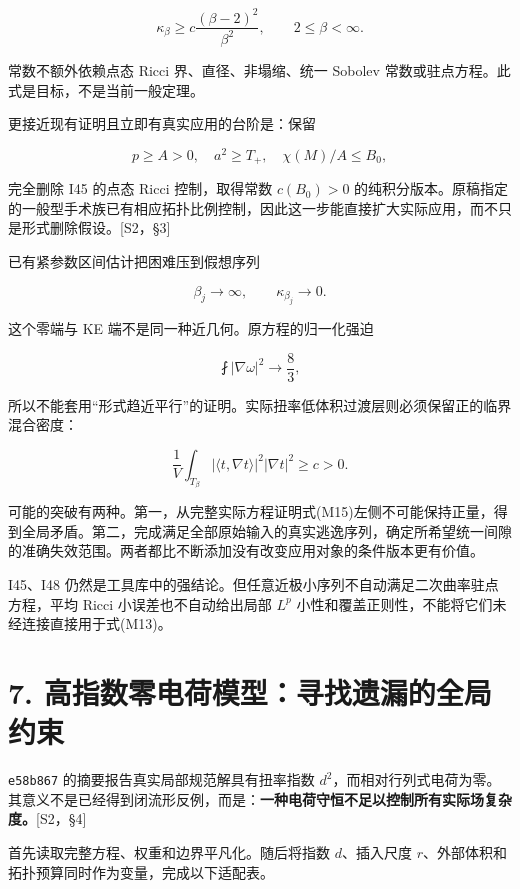 \documentclass[UTF8,a4paper,11pt,fontset=fandol]{ctexart}
\begin{document}
\[
\boxed{\kappa_\beta\ge c\frac{(\beta-2)^2}{\beta^2},
\qquad2\le\beta<\infty.}
\tag{M12}
\]

常数不额外依赖点态 Ricci 界、直径、非塌缩、统一 Sobolev
常数或驻点方程。此式是目标，不是当前一般定理。

更接近现有证明且立即有真实应用的台阶是：保留

\[
p\ge A>0,\quad a^2\ge T_+,\quad\chi(M)/A\le B_0,
\]

完全删除 I45 的点态 Ricci 控制，取得常数 \(c(B_0)>0\)
的纯积分版本。原稿指定的一般型手术族已有相应拓扑比例控制，因此这一步能直接扩大实际应用，而不只是形式删除假设。{[}S2，§3{]}

已有紧参数区间估计把困难压到假想序列

\[
\beta_j\to\infty,\qquad\kappa_{\beta_j}\to0.
\tag{M13}
\]

这个零端与 KE 端不是同一种近几何。原方程的归一化强迫

\[
\fint|\nabla\omega|^2\to\frac83,
\tag{M14}
\]

所以不能套用``形式趋近平行''的证明。实际扭率低体积过渡层则必须保留正的临界混合密度：

\[
\frac1V\int_{T_\beta}
|\langle t,\nabla t\rangle|^2|\nabla t|^2\ge c>0.
\tag{M15}
\]

可能的突破有两种。第一，从完整实际方程证明式(M15)左侧不可能保持正量，得到全局矛盾。第二，完成满足全部原始输入的真实逃逸序列，确定所希望统一间隙的准确失效范围。两者都比不断添加没有改变应用对象的条件版本更有价值。

I45、I48
仍然是工具库中的强结论。但任意近极小序列不自动满足二次曲率驻点方程，平均
Ricci 小误差也不自动给出局部 \(L^p\)
小性和覆盖正则性，不能将它们未经连接直接用于式(M13)。

\section{7.
高指数零电荷模型：寻找遗漏的全局约束}\label{ux9ad8ux6307ux6570ux96f6ux7535ux8377ux6a21ux578bux5bfbux627eux9057ux6f0fux7684ux5168ux5c40ux7ea6ux675f}

\texttt{e58b867} 的摘要报告真实局部规范解具有扭率指数
\(d^2\)，而相对行列式电荷为零。其意义不是已经得到闭流形反例，而是：\textbf{一种电荷守恒不足以控制所有实际场复杂度。}{[}S2，§4{]}

首先读取完整方程、权重和边界平凡化。随后将指数 \(d\)、插入尺度
\(r\)、外部体积和拓扑预算同时作为变量，完成以下适配表。
\end{document}
